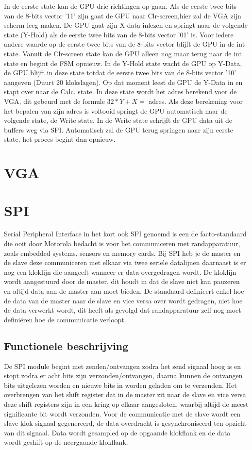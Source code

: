 \documentclass[oneside,dutch]{tudelft-report}
\begin{document}
In de eerste state kan de GPU drie richtingen op gaan. Als de eerste twee bits van de 8-bits vector '11' zijn gaat de GPU naar Clr-screen,hier zal de VGA zijn scherm leeg maken. De GPU gaat zijn X-data inlezen en springt naar de volgende state (Y-Hold) als de eerste twee bits van de 8-bits vector '01' is. Voor iedere andere waarde op de eerste twee bits van de 8-bits vector blijft de GPU in de int state. Vanuit de Clr-screen state kan de GPU alleen nog maar terug naar de int state en begint de FSM opnieuw. In de Y-Hold state wacht de GPU op Y-Data, de GPU blijft in deze state totdat de eerste twee bits van de 8-bits vector '10' aangeven (Duurt 20 klokslagen). Op dat moment leest de GPU de Y-Data in en stapt over naar de Calc. state. In deze state wordt het adres berekend voor de VGA, dit gebeurd met de formule $32*Y+X =$ adres. Als deze berekening voor het bepalen van zijn adres is voltooid springt de GPU automatisch naar de volgende state, de Write state. In de Write state schrijft de GPU data uit de buffers weg via SPI. Automatisch zal de GPU terug springen naar zijn eerste state, het proces begint dan opnieuw. 

\chapter{VGA}
\newpage

\chapter{SPI}
Serial Peripheral Interface in het kort ook SPI genoemd is een de facto-standaard die ooit door Motorola bedacht is voor het communiceren met randapparatuur, zoals embedded systems, sensors en memory cards. Bij SPI heb je de master en de slave deze communiceren met elkaar via twee seriële datalijnen daarnaast is er nog een kloklijn die aangeeft wanneer er data overgedragen wordt. De kloklijn wordt aangestuurd door de master, dit houdt in dat de slave niet kan pauzeren en altijd data aan de master aan moet bieden. De standaard definieert enkel hoe de data van de master naar de slave en vice versa over wordt gedragen, niet hoe de data verwerkt wordt, dit heeft als gevolgd dat randapparatuur zelf nog moet definiëren hoe de communicatie verloopt.

\section{Functionele beschrijving}
De SPI module begint met zenden/ontvangen zodra het send signaal hoog is en stopt zodra er acht bits zijn verzonden/ontvangen, daarna kunnen de ontvangen bits uitgelezen worden en nieuwe bits in worden geladen om te verzenden. Het overbrengen van het shift register dat in de master zit naar de slave en vice versa deze shift registers zijn in een kring op elkaar aangesloten, waarbij altijd de meest significante bit wordt verzonden. Voor de communicatie met de slave wordt een slave klok signaal gegenereerd, de data overdracht is gesynchroniseerd ten opzicht van dit signaal. Data wordt gesampled op de opgaande klokflank en de data wordt geshift op de neergaande klokflank.
\end{document}
